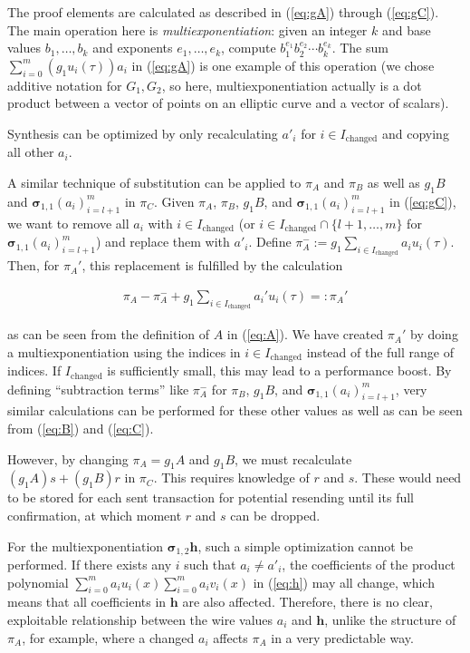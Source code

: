 \documentclass{article}
\begin{document}
The proof elements are calculated as described in (\ref{eq:gA}) through (\ref{eq:gC}).
The main operation here is \textit{multiexponentiation}: given an integer $k$ and base values $b_1, \ldots, b_k$ and exponents $e_1, \ldots, e_k$, compute $b_1^{e_1}b_2^{e_2}\cdots b_k^{e_k}$.
The sum $\sum_{i=0}^m {(g_1{u_i(\tau)})}{a_i}$ in (\ref{eq:gA}) is one example of this operation (we chose additive notation for $G_1, G_2$, so here, multiexponentiation actually is a dot product between a vector of points on an elliptic curve and a vector of scalars).

Synthesis can be optimized by only recalculating $a'_i$ for $i \in I_\text{changed}$ and copying all other $a_i$.

A similar technique of substitution can be applied to $\pi_A$ and $\pi_B$ as well as $g_1B$ and $\boldsymbol\sigma_{1,1}(a_i)_{i=l+1}^m$ in $\pi_C$.
Given $\pi_A$, $\pi_B$, $g_1B$, and $\boldsymbol\sigma_{1,1}(a_i)_{i=l+1}^m$ in (\ref{eq:gC}), we want to remove all $a_i$ with $i \in I_\text{changed}$ (or $i \in I_\text{changed} \cap \{l+1,\ldots,m\}$ for $\boldsymbol\sigma_{1,1}(a_i)_{i=l+1}^m$) and replace them with $a'_i$.
Define $\pi^-_A := g_1{\sum_{i \in I_\text{changed}}a_iu_i(\tau)}$.
Then, for $\pi_A'$, this replacement is fulfilled by the calculation

\begin{align*}
        \pi_A - \pi^-_A + g_1{\sum_{i \in I_\text{changed}}a_i'u_i(\tau)} =: \pi_A'
\end{align*}

as can be seen from the definition of $A$ in (\ref{eq:A}).
We have created $\pi_A'$ by doing a multiexponentiation using the indices in $i \in I_\text{changed}$ instead of the full range of indices.
If $I_\text{changed}$ is sufficiently small, this may lead to a performance boost.
By defining ``subtraction terms'' like $\pi^-_A$ for $\pi_B$, $g_1B$, and $\boldsymbol\sigma_{1,1}(a_i)_{i=l+1}^m$, very similar calculations can be performed for these other values as well as can be seen from (\ref{eq:B}) and (\ref{eq:C}).

However, by changing $\pi_A = g_1A$ and $g_1B$, we must recalculate ${(g_1A)}s + {(g_1B)}r$ in $\pi_C$.
This requires knowledge of $r$ and $s$.
These would need to be stored for each sent transaction for potential resending until its full confirmation, at which moment $r$ and $s$ can be dropped.

For the multiexponentiation $\boldsymbol\sigma_{1,2}\boldsymbol{h}$, such a simple optimization cannot be performed.
If there exists any $i$ such that $a_i \neq a'_i$, the coefficients of the product polynomial $\sum_{i=0}^ma_iu_i(x)\sum_{i=0}^ma_iv_i(x)$ in (\ref{eq:h}) may all change, which means that all coefficients in $\boldsymbol{h}$ are also affected.
Therefore, there is no clear, exploitable relationship between the wire values $a_i$ and $\boldsymbol{h}$, unlike the structure of $\pi_A$, for example, where a changed $a_i$ affects $\pi_A$ in a very predictable way.
\end{document}
